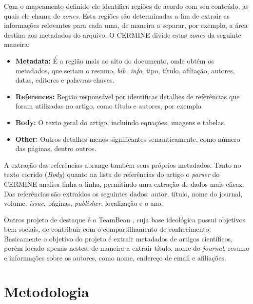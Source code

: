 \documentclass[
	12pt,               %
	openright,          %
	twoside,            %
	a4paper,            %
	english,            %
	brazil              %
	]{abntex2}
\begin{document}
Com o mapeamento definido ele identifica regiões de acordo com seu conteúdo, as quais ele chama de \textit{zones}. Esta regiões são determinadas a fim de extrair as informações relevantes para cada uma, de maneira a separar, por exemplo, a área destina aos metadados do arquivo. O CERMINE divide estas \textit{zones} da seguinte maneira:

\begin{itemize}
\item \textbf{Metadata:} É a região mais ao alto do documento, onde obtém os metadados, que seriam o resumo, \textit{bib\_info}, tipo, título, afiliação, autores, datas, editores e palavras-chaves.
\item \textbf{References:} Região responsável por identificas detalhes de referências que foram utilizadas no artigo, como título e autores, por exemplo
\item \textbf{Body:} O texto geral do artigo, incluindo equações, imagens e tabelas.
\item \textbf{Other:} Outros detalhes menos significantes semanticamente, como número das páginas, dentro outros.
\end{itemize}

A extração das referências abrange também seus próprios metadados. Tanto no texto corrido (\textit{Body}) quanto na lista de referências do artigo o \textit{parser} do CERMINE analisa linha a linha, permitindo uma extração de dados mais eficaz. Das referências são extraídos os seguintes dados: autor, título, nome do journal, volume, \textit{issue}, páginas, \textit{publisher}, localização e o ano.


Outros projeto de destaque é o TeamBean \cite{teambeam}, cuja base ideológica possui objetivos bem sociais, de contribuir com o compartilhamento de conhecimento. Basicamente o objetivo do projeto é extrair metadados de artigos científicos, porém focado apenas nestes, de maneira a extrair título, nome do \textit{journal}, resumo e informações sobre os autores, como nome, endereço de email e afiliações.





	

	 

\chapter{Metodologia}
\end{document}
